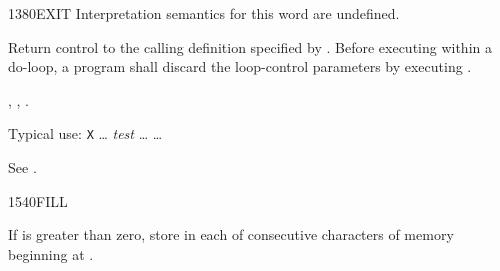 \begin{worddef}{1380}{EXIT}
\interpret
	Interpretation semantics for this word are undefined.

\execute
	\stack{}{}

	Return control to the calling definition specified by
	. Before executing  within a
	do-loop, a program shall discard the loop-control parameters
	by executing .

\see {},
	,
	.

	\begin{rationale} %
		Typical use:
			\word{:} \texttt{X} {\ldots}
				\emph{test} 
				{\ldots}  
			{\ldots} \word{;}
	\end{rationale}

	\begin{testing} %
		See .
	\end{testing}
\end{worddef}


\begin{worddef}{1540}{FILL}
\item {}

	If  is greater than zero, store  in each of
	 consecutive characters of memory beginning at
	.

	\begin{testing} %
		 \\

		 \\

		 \\
	\end{testing}
\end{worddef}


